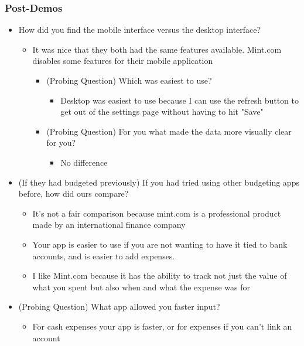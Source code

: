 \documentclass{chi2011}
\begin{document}
\begin{itemize}[noitemsep]
	\subsubsection{Post-Demos}
	\begin{itemize}[noitemsep]
		\item How did you find the mobile interface versus the desktop interface?
		\begin{itemize}[noitemsep]
			\item It was nice that they both had the same features available. Mint.com disables some
				  features for their mobile application
			\begin{itemize}[noitemsep]
				\item (Probing Question) Which was easiest to use?
				\begin{itemize}[noitemsep]
					\item Desktop was easiest to use because I can use the refresh button to get out of the
						  settings page without having to hit "Save"
				\end{itemize}
			\item (Probing Question) For you what made the data more visually clear for you?
				\begin{itemize}[noitemsep]
					\item No difference
				\end{itemize}
			\end{itemize}
		\end{itemize}	
	\item (If they had budgeted previously) If you had tried using other budgeting apps before, how did ours compare?
		\begin{itemize}[noitemsep]
			\item It's not a fair comparison because mint.com is a professional product made by an 
				  international finance company
			\item Your app is easier to use if you are not wanting to have it tied to bank accounts, and is
				  easier to add expenses.
			\item I like Mint.com because it has the ability to track not just the value of what you spent
				  but also when and what the expense was for
		\end {itemize}
	\item (Probing Question) What app allowed you faster input?
		\begin{itemize}[noitemsep]
			\item For cash expenses your app is faster, or for expenses if you can't link an account

\end{itemize}
\end{itemize}
\end{itemize}
\end{document}

